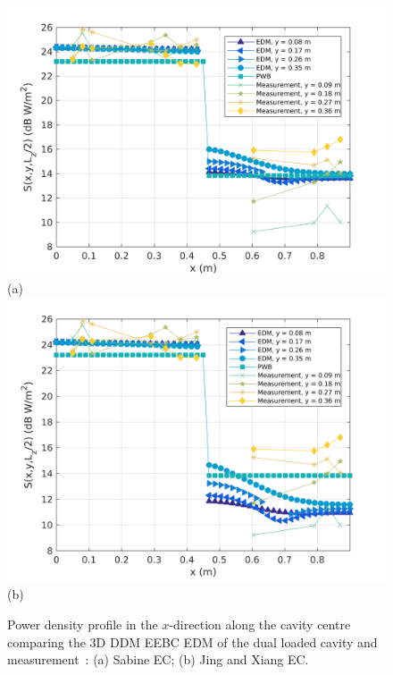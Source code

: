 \documentclass[a4paper]{article}
\numberwithin{equation}{section}
\begin{document}
\begin{figure}[hp]
\begin{center}
\includegraphics[width=0.6\linewidth]{figures/DDM-EEBC_3D_DL_PowerDensityProfileXMeas}\\
{\footnotesize (a)}\\
\vspace{2mm}
\includegraphics[width=0.6\linewidth]{figures/DDM-EEBC_3D_DL_PowerDensityProfileXMeas_JX}\\
{\footnotesize (b)}\\
\vspace{-2mm}
\caption{\label{fg:measprofsdl} Power density profile in the $x$-direction along the cavity centre comparing
the 3D DDM EEBC EDM of the dual loaded cavity and measurement~\citep{Flintoft2017b}: (a) Sabine EC; (b) Jing and Xiang EC.}
\end{center}
\end{figure}
\end{document}
